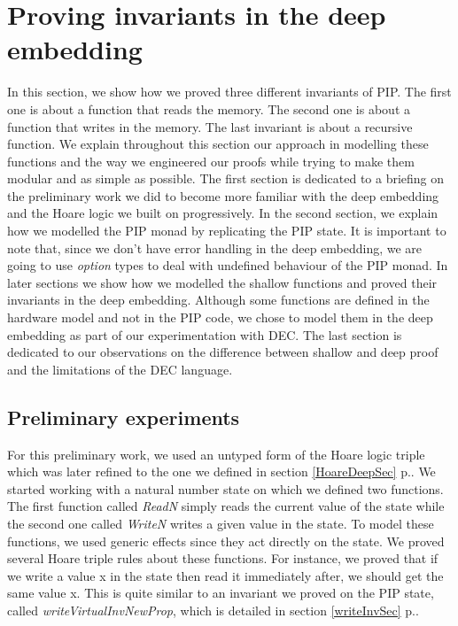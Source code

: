 \chapter{Proving invariants in the deep embedding} \label{Work}
In this section, we show how we proved three different invariants of PIP. The first one is about a function that reads the memory. The second one is about a function that writes in the memory. The last invariant is about a recursive function. We explain throughout this section our approach in modelling these functions and the way we engineered our proofs while trying to make them modular and as simple as possible. The first section is dedicated to a briefing on the preliminary work we did to become more familiar with the deep embedding and the Hoare logic we built on progressively.
In the second section, we explain how we modelled the PIP monad by replicating the PIP state. It is important to note that, since we don't have error handling in the deep embedding, we are going to use \textit{option} types to deal with undefined behaviour of the PIP monad. In later sections we show how we modelled the shallow functions and proved their invariants in the deep embedding. Although some functions are defined in the hardware model and not in the PIP code, we chose to model them in the deep embedding as part of our experimentation with DEC. The last section is dedicated to our observations on the difference between shallow and deep proof and the limitations of the DEC language. 

\section{Preliminary experiments}
For this preliminary work, we used an untyped form of the Hoare logic triple which was later refined to the one we defined in section \ref{HoareDeepSec} p.\pageref{HoareDeepSec}. We started working with a natural number state on which we defined two functions. The first function called \textit{ReadN} simply reads the current value of the state while the second one called \textit{WriteN} writes a given value in the state. To model these functions, we used generic effects since they act directly on the state. We proved several Hoare triple rules about these functions. For instance, we proved that if we write a value x in the state then read it immediately after, we should get the same value x. This is quite similar to an invariant we proved on the PIP state, called  \textit{writeVirtualInvNewProp}, which is  detailed in section \ref{writeInvSec} p.\pageref{writeInvSec}. \\ \pagebreak

